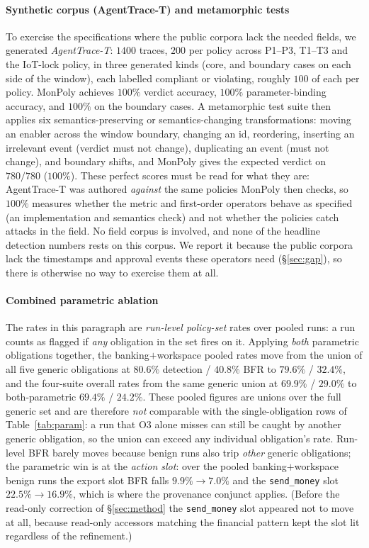 \documentclass[sigconf]{acmart}
\begin{document}
\paragraph{Synthetic corpus (AgentTrace-T) and metamorphic tests} To exercise the
specifications where the public corpora lack the needed fields, we generated
\emph{AgentTrace-T}: $1400$ traces, $200$ per policy across P1--P3, T1--T3 and the
IoT-lock policy, in three generated kinds (core, and boundary cases on each side of the
window), each labelled compliant or violating, roughly $100$ of each per policy. MonPoly
achieves $100\%$ verdict accuracy, $100\%$ parameter-binding accuracy, and $100\%$ on
the boundary cases. A metamorphic test suite then applies six semantics-preserving or
semantics-changing transformations: moving an enabler across the window boundary,
changing an id, reordering, inserting an irrelevant event (verdict must not change),
duplicating an event (must not change), and boundary shifts, and MonPoly gives the
expected verdict on $780/780$ ($100\%$). These perfect scores must be read for what
they are: AgentTrace-T was authored \emph{against} the same policies MonPoly then
checks, so $100\%$ measures whether the metric and first-order operators behave as
specified (an implementation and semantics check) and not whether the policies
catch attacks in the field. No field corpus is involved, and none of the headline
detection numbers rests on this corpus. We report it because the public corpora lack
the timestamps and approval events these operators need
(\S\ref{sec:gap}), so there is otherwise no way to exercise them at all.

\paragraph{Combined parametric ablation} The rates in this paragraph are
\emph{run-level policy-set} rates over pooled runs: a run counts as flagged if
\emph{any} obligation in the set fires on it. Applying \emph{both} parametric
obligations together, the banking$+$workspace pooled rates move from the union of all
five generic obligations at $80.6\%$ detection / $40.8\%$ BFR to $79.6\%$ / $32.4\%$,
and the four-suite overall rates from the same generic union at $69.9\%$ / $29.0\%$ to
both-parametric $69.4\%$ / $24.2\%$. These pooled figures are unions over the full
generic set and are therefore \emph{not} comparable with the single-obligation rows of
Table~\ref{tab:param}: a run that O3 alone misses can still be caught by another
generic obligation, so the union can exceed any individual obligation's rate. Run-level BFR barely moves
because benign runs also trip \emph{other} generic obligations; the parametric win is
at the \emph{action slot}: over the pooled banking$+$workspace benign runs the export
slot BFR falls $9.9\%\!\to\!7.0\%$ and the \texttt{send\_money} slot
$22.5\%\!\to\!16.9\%$, which is where the provenance conjunct applies. (Before the
read-only correction of \S\ref{sec:method} the \texttt{send\_money} slot appeared not to
move at all, because read-only accessors matching the financial pattern kept the slot lit
regardless of the refinement.)
\end{document}
